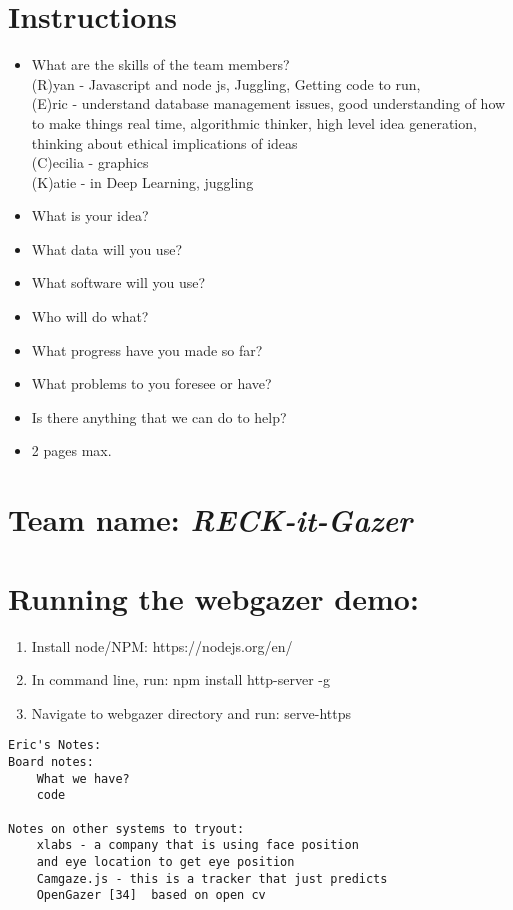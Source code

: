 \section*{Instructions}
\begin{itemize}
  \item What are the skills of the team members?\\
  (R)yan - Javascript and node js, Juggling, Getting code to run, \\
  (E)ric - 
    understand database management issues, good understanding of how to make things real time, algorithmic thinker, high level idea generation, thinking about ethical implications of ideas\\
  (C)ecilia - graphics \\
  (K)atie - in Deep Learning, juggling \\
  
  \item What is your idea?
  \item What data will you use?
  \item What software will you use?
  \item Who will do what?
  \item What progress have you made so far?
  \item What problems to you foresee or have?
  \item Is there anything that we can do to help?
  \item 2 pages max.
\end{itemize}

\section*{Team name: \emph{RECK-it-Gazer}}

\section*{Running the webgazer demo:}


\begin{enumerate}
\item
Install node/NPM:
    https://nodejs.org/en/
\item
In command line, run: 
    npm install http-server -g
\item
Navigate to webgazer directory and run: 
    serve-https
\end{enumerate}

\begin{verbatim}
Eric's Notes:
Board notes:
    What we have?
    code 

Notes on other systems to tryout:
    xlabs - a company that is using face position 
    and eye location to get eye position
    Camgaze.js - this is a tracker that just predicts 
    OpenGazer [34]  based on open cv
    
    
\end{verbatim}

